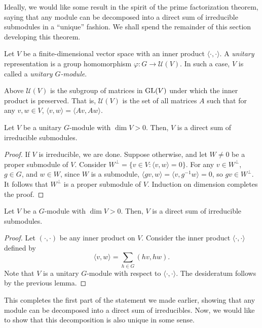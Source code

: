 	Ideally, we would like some result in the spirit of the prime factorization theorem, saying that any module can be decomposed into a direct sum of irreducible submodules in a ``unique'' fashion. We shall spend the remainder of this section developing this theorem.

	\begin{fdef}
		Let $V$ be a finite-dimensional vector space with an inner product $\langle \cdot,\cdot\rangle$. A \emph{unitary} representation is a group homomorphism $\varphi : G \to \mathcal{U}(V)$. In such a case, $V$ is called a \emph{unitary $G$-module}.
	\end{fdef}
	Above $\mathcal{U}(V)$ is the subgroup of matrices in $\operatorname{GL}(V)$ under which the inner product is preserved. That is, $\mathcal{U}(V)$ is the set of all matrices $A$ such that for any $v,w \in V$, $\langle v,w\rangle = \langle Av,Aw\rangle$.

	\begin{lemma}
		Let $V$ be a unitary $G$-module with $\dim V > 0$. Then, $V$ is a direct sum of irreducible submodules.
	\end{lemma}
	\begin{proof}
		If $V$ is irreducible, we are done. Suppose otherwise, and let $W \ne 0$ be a proper submodule of $V$. Consider $W^\perp = \{ v \in V : \langle v,w\rangle = 0 \}$. For any $v \in W^\perp$, $g \in G$, and $w \in W$, since $W$ is a submodule, $\langle gv,w\rangle = \langle v,g^{-1}w\rangle = 0$, so $gv \in W^\perp$. It follows that $W^\perp$ is a proper submodule of $V$. Induction on dimension completes the proof. 
	\end{proof}

	\begin{flem}
		Let $V$ be a $G$-module with $\dim V > 0$. Then, $V$ is a direct sum of irreducible submodules.
	\end{flem}
	\begin{proof}
		Let $(\cdot,\cdot)$ be any inner product on $V$. Consider the inner product $\langle \cdot,\cdot\rangle$ defined by
		\[ \langle v,w\rangle = \sum_{h \in G} ( hv,hw ). \]
		Note that $V$ is a unitary $G$-module with respect to $\langle \cdot,\cdot\rangle$. The desideratum follows by the previous lemma.
	\end{proof}

	This completes the first part of the statement we made earlier, showing that any module can be decomposed into a direct sum of irreducibles. Now, we would like to show that this decomposition is also unique in some sense.


